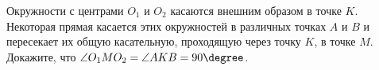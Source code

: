\begin{ex}
	\begin{condition}
		Окружности с центрами \( O_1  \) и \( O_2 \) касаются внешним образом в точке \( K \). Некоторая прямая касается этих окружностей в различных точках \( A  \) и \( B  \) и пересекает их общую касательную, проходящую через точку \( K \), в точке \( M  \). Докажите, что \( \angle O_1MO_2 = \angle AKB = 90 \degree \).
	\end{condition}
\end{ex}